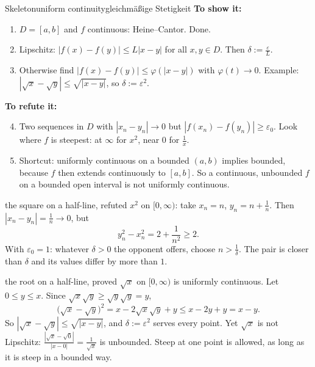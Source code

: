 \documentclass{kaelearn}
\newcommand\eps{\varepsilon}
\begin{document}
\begin{panel}[unbreakable]{Skeleton}{uniform continuity}{gleichmäßige Stetigkeit}
\textbf{To show it:}
\begin{enumerate}
  \item $D=[a,b]$ and $f$ continuous: Heine--Cantor. Done.
  \item Lipschitz: $|f(x)-f(y)|\le L|x-y|$ for all $x,y\in D$. Then $\delta:=\frac\eps L$.
  \item Otherwise find $|f(x)-f(y)|\le\varphi(|x-y|)$ with $\varphi(t)\to0$. Example: $|\sqrt x-\sqrt y|\le\sqrt{|x-y|}$, so
        $\delta:=\eps^2$.
\end{enumerate}
\textbf{To refute it:}
\begin{enumerate}
  \setcounter{enumi}{3}
  \item Two sequences in $D$ with $|x_n-y_n|\to0$ but $|f(x_n)-f(y_n)|\ge\eps_0$. Look where $f$ is steepest: at $\infty$ for
        $x^2$, near $0$ for $\frac1x$.
  \item Shortcut: uniformly continuous on a bounded $(a,b)$ implies bounded, because $f$ then extends continuously to $[a,b]$.
        So a continuous, unbounded $f$ on a bounded open interval is not uniformly continuous.
\end{enumerate}
\end{panel}

\begin{example}{the square on a half-line, refuted}
$x^2$ on $[0,\infty)$: take $x_n=n$, $y_n=n+\frac1n$. Then $|x_n-y_n|=\frac1n\to0$, but
\[ y_n^2-x_n^2=2+\frac1{n^2}\ge2 . \]
With $\eps_0=1$: whatever $\delta>0$ the opponent offers, choose $n>\frac1\delta$. The pair is closer than $\delta$ and its
values differ by more than $1$.
\end{example}

\begin{example}{the root on a half-line, proved}
$\sqrt x$ on $[0,\infty)$ is uniformly continuous. Let $0\le y\le x$. Since $\sqrt x\sqrt y\ge\sqrt y\sqrt y=y$,
\[ \bigl(\sqrt x-\sqrt y\bigr)^2=x-2\sqrt x\sqrt y+y\le x-2y+y=x-y . \]
So $|\sqrt x-\sqrt y|\le\sqrt{|x-y|}$, and $\delta:=\eps^2$ serves every point. Yet $\sqrt x$ is not Lipschitz:
$\frac{|\sqrt x-\sqrt0|}{|x-0|}=\frac1{\sqrt x}$ is unbounded. Steep at one point is allowed, as long as it is steep in a bounded
way.
\end{example}

\end{document}
